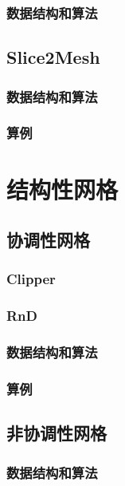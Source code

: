 \subsubsection{数据结构和算法}

\subsection{Slice2Mesh}

\subsubsection{数据结构和算法}

\subsubsection{算例}

\section{结构性网格}

\subsection{协调性网格}

\subsubsection{Clipper}

\subsubsection{RnD}

\subsubsection{数据结构和算法}

\subsubsection{算例}

\subsection{非协调性网格}

\subsubsection{数据结构和算法}

